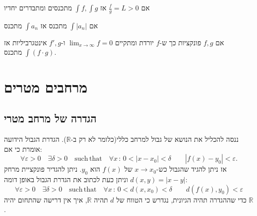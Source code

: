 \documentclass{tstextbook}
\begin{document}
\begin{proposition}
אם \(\frac{f}{g} = L > 0\) אז \(\int f, \int g\) מתכנסים ומתבדרים יחדיו

\end{proposition}
\begin{definition}
אם \(\int |a_n|\) מתכנס אז \(\int a_n\) מתכנס

\end{definition}
\begin{proposition}
אם \(f,g\) פונקציות כך ש-\(f\) יורדת ומתקיים \(\lim_{x\rightarrow \infty} f = 0\) ו-\(f', g\) אינטגרביליות אז \(\int (f\cdot g)\) מתכנס.

\end{proposition}
\begin{proposition}
\end{proposition}
\section{מרחבים מטרים}

\subsection{הגדרה של מרחב מטרי}

ננסה להכליל את הנושא של גבול למרחב כללי(כלומר לא רק ב-\(\mathbb{R}\)). הגדרת הגבול הידועה אומרת כי אם:
$$\forall\varepsilon>0\quad\exists\delta>0\quad\mathrm{such\,that}\quad\forall x\,:\,0<\left|x-x_{0}\right|<\delta\qquad\left|f(x)-y_{0}\right|<\varepsilon.$$
אז ניתן להגיד שהגבול כש-\(x\to x_{0}\)  של \(f(x)\) הוא \(y_{0}\). ניתן להגדיר פונקציית מרחק \(d(x,y)=|x-y|\) וניתן כעת לכתוב את הגדרת הגבול באופן דומה:
$$\forall\varepsilon>0\quad\exists\delta>0\quad\mathrm{such\,that}\quad\forall x\,:\,0<d(x,x_{0})<\delta\qquad d(f(x),y_{0})<\varepsilon$$
כדי שההגדרה תהיה הגיונית, נגדרש כי הטווח של \(d\) תהיה \(\mathbb{R}\), איך אין דרישה שהתחום יהיה \(\mathbb{R}\).
\end{document}
